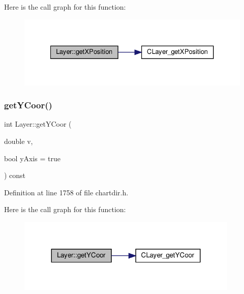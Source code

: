 Here is the call graph for this function\+:
\nopagebreak
\begin{figure}[H]
\begin{center}
\leavevmode
\includegraphics[width=327pt]{class_layer_a9366bceb749abf3702fe6cc83a436da1_cgraph}
\end{center}
\end{figure}
\mbox{\label{class_layer_ab6939819507f042906513ec21489b3bc}} 
\subsubsection{\texorpdfstring{get\+Y\+Coor()}{getYCoor()}\hspace{0.1cm}{\footnotesize\ttfamily [1/2]}}
{\footnotesize\ttfamily int Layer\+::get\+Y\+Coor (\begin{DoxyParamCaption}\item[{double}]{v,  }\item[{bool}]{y\+Axis = {\ttfamily true} }\end{DoxyParamCaption}) const\hspace{0.3cm}{\ttfamily [inline]}}



Definition at line 1758 of file chartdir.\+h.

Here is the call graph for this function\+:
\nopagebreak
\begin{figure}[H]
\begin{center}
\leavevmode
\includegraphics[width=299pt]{class_layer_ab6939819507f042906513ec21489b3bc_cgraph}
\end{center}
\end{figure}
\mbox{\label{class_layer_aee258204d7c1ac071d71664025e48bc0}} 
